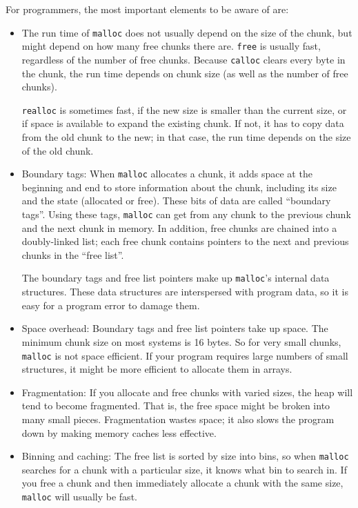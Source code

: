 \documentclass[12pt]{book}
\begin{document}
{For programmers, the most important elements to be aware of are:

\begin{itemize}

\item The run time of {\tt malloc} does not usually depend on the
size of the chunk, but might depend on how many free chunks there
are.  {\tt free} is usually fast, regardless of the number of
free chunks.  Because {\tt calloc} clears every byte in the chunk,
the run time depends on chunk size (as well as the number of free
chunks).

{\tt realloc} is sometimes fast, if the new size is smaller than the
current size, or if space is available to expand the existing chunk.
If not, it has to copy data from the old chunk to the new; in that
case, the run time depends on the size of the old chunk.

\item Boundary tags: When {\tt malloc} allocates a chunk, it adds
  space at the beginning and end to store information about the chunk,
  including its size and the state (allocated or free).  These bits of
  data are called ``boundary tags''.  Using these tags, {\tt malloc}
  can get from any chunk to the previous chunk and the next chunk in
  memory.  In addition, free chunks are chained into a doubly-linked
  list; each free chunk contains pointers to the next and previous
  chunks in the ``free list''.

The boundary tags and free list pointers make up {\tt malloc}'s
internal data structures.  These data structures are interspersed with
program data, so it is easy for a program error to damage them.

\item Space overhead: Boundary tags and free list pointers take up
  space.  The minimum chunk size on most systems is 16 bytes.  So for
  very small chunks, {\tt malloc} is not space efficient.  If your
  program requires large numbers of small structures, it might be more
  efficient to allocate them in arrays.

\item Fragmentation: If you allocate and free chunks with varied
  sizes, the heap will tend to become fragmented.  That is, the free
  space might be broken into many small pieces.  Fragmentation wastes
  space; it also slows the program down by making memory caches less
  effective.

\item Binning and caching: The free list is sorted by size into bins,
  so when {\tt malloc} searches for a chunk with a particular size, it
  knows what bin to search in.  If you free a chunk and then
  immediately allocate a chunk with the same size, {\tt malloc} will
  usually be fast.


\end{itemize}}
\end{document}
